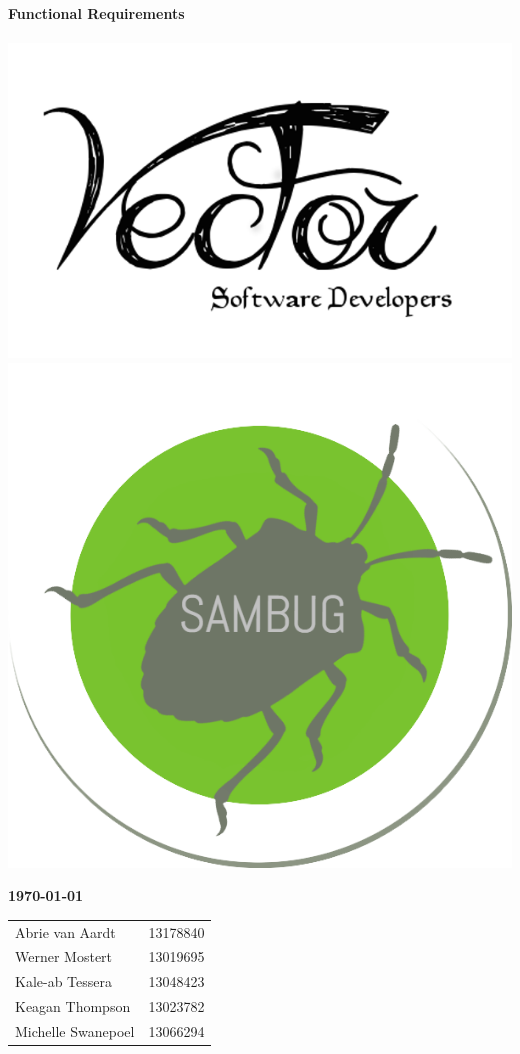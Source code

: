 \documentclass[11pt,a4paper,titlepage]{article}
\begin{document}
\begin{titlepage}
    \vspace*{-0.5cm}
	  \huge \textbf {Functional Requirements}\\
	  \hfill\\
	\vspace*{-0.5cm}  
      \includegraphics[scale=0.2]{logo}\hfill
	\includegraphics[scale=0.2]{sambug_logo}
         
    \vskip2cm
          
    \large \textbf{\monthyeardate\today}
  
    \vfill
\begin{tabular}{lr}
        	Abrie van Aardt&13178840\\
		Werner Mostert&13019695\\
		Kale-ab Tessera&13048423\\
		Keagan Thompson&13023782\\
		Michelle Swanepoel&13066294\\
	\end{tabular}
\end{titlepage}
	
\end{document}
